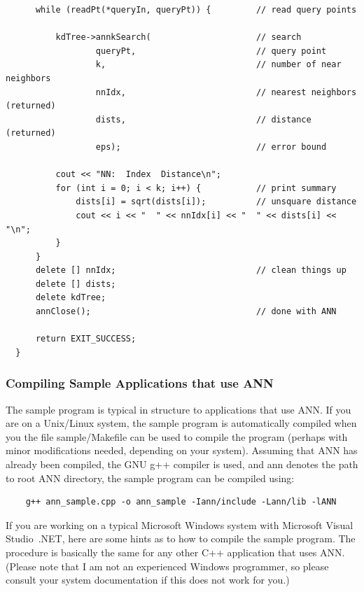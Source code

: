\documentclass[11pt]{article}		%
\newcommand{\ANN}[0]{\textsf{ANN}}
\begin{document}
{\begin{verbatim}
      while (readPt(*queryIn, queryPt)) {         // read query points
  
          kdTree->annkSearch(                     // search
                  queryPt,                        // query point
                  k,                              // number of near neighbors
                  nnIdx,                          // nearest neighbors (returned)
                  dists,                          // distance (returned)
                  eps);                           // error bound
  
          cout << "NN:  Index  Distance\n";
          for (int i = 0; i < k; i++) {           // print summary
              dists[i] = sqrt(dists[i]);          // unsquare distance
              cout << i << "  " << nnIdx[i] << "  " << dists[i] << "\n";
          }
      }
      delete [] nnIdx;                            // clean things up
      delete [] dists;
      delete kdTree;
      annClose();                                 // done with ANN
  
      return EXIT_SUCCESS;
  }
\end{verbatim} }

\subsubsection{Compiling Sample Applications that use {\ANN}}
\label{compilesample.sec}

The sample program is typical in structure to applications that use
{\ANN}.  If you are on a Unix/Linux system, the sample program is
automatically compiled when you the file \textsf{sample/Makefile} can be
used to compile the program (perhaps with minor modifications needed,
depending on your system).  Assuming that {\ANN} has already been
compiled, the GNU g++ compiler is used, and \textsf{ann} denotes the
path to root {\ANN} directory, the sample program can be compiled using:

{\small \begin{verbatim}
    g++ ann_sample.cpp -o ann_sample -Iann/include -Lann/lib -lANN
\end{verbatim} }

If you are working on a typical Microsoft Windows system with Microsoft
Visual Studio~.NET, here are some hints as to how to compile the sample
program. The procedure is basically the same for any other C++
application that uses {\ANN}.  (Please note that I am not an experienced
Windows programmer, so please consult your system documentation if this
does not work for you.)
\end{document}
